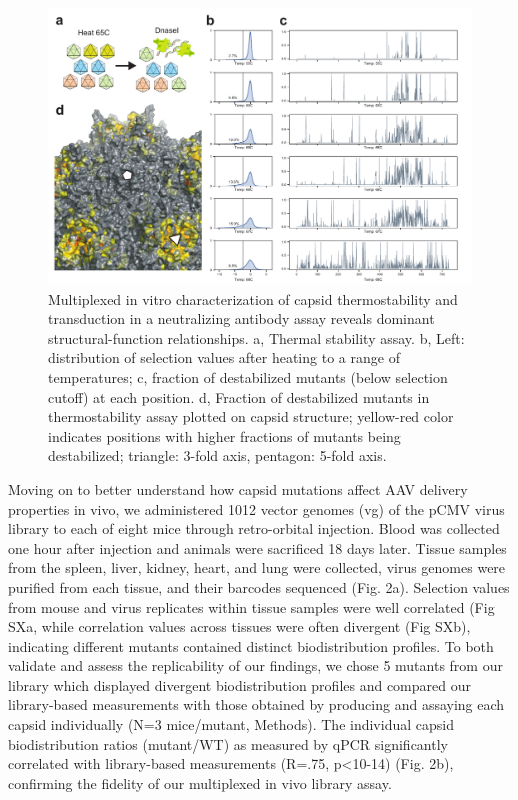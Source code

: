 \begin{figure}
\includegraphics[width=1\linewidth]{figures/20181130_supp4_tmonly.pdf}
\caption[Multiplexed in vitro characterization of capsid thermostability and transduction in a neutralizing antibody assay reveals dominant structural-function relationships.]{Multiplexed in vitro characterization of capsid thermostability and transduction in a neutralizing antibody assay reveals dominant structural-function relationships.
a, Thermal stability assay. b, Left: distribution of selection values after heating to a range of temperatures; c, fraction of destabilized mutants (below selection cutoff) at each position. d, Fraction of destabilized mutants in thermostability assay plotted on capsid structure; yellow-red color indicates positions with higher fractions of mutants being destabilized; triangle: 3-fold axis, pentagon: 5-fold axis.
\label{fig:Figure 3}}
\end{figure}

Moving on to better understand how capsid mutations affect AAV delivery properties in vivo, we administered 1012 vector genomes (vg) of the pCMV virus library to each of eight mice through retro-orbital injection. Blood was collected one hour after injection and animals were sacrificed 18 days later. Tissue samples from the spleen, liver, kidney, heart, and lung were collected, virus genomes were purified from each tissue, and their barcodes sequenced (Fig. 2a). Selection values from mouse and virus replicates within tissue samples were well correlated (Fig SXa, while correlation values across tissues were often divergent (Fig SXb), indicating different mutants contained distinct biodistribution profiles. To both validate and assess the replicability of our findings, we chose 5 mutants from our library which displayed divergent biodistribution profiles and compared our library-based measurements with those obtained by producing and assaying each capsid individually (N=3 mice/mutant, Methods). The individual capsid biodistribution ratios (mutant/WT) as measured by qPCR significantly correlated with library-based measurements (R=.75, p<10-14) (Fig. 2b), confirming the fidelity of our multiplexed in vivo library assay. 

